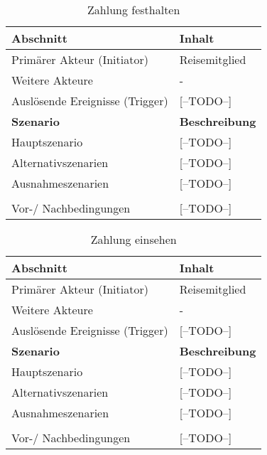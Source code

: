 \begin{table}[H]
	\caption{Zahlung festhalten}
	\begin{tabularx}{0.95\textwidth}{ |X|X| }
		\hline
		\rowcolor{gray} \textbf{Abschnitt}     & \textbf{Inhalt}       \\
		\hline
		Primärer Akteur (Initiator)            & Reisemitglied         \\
		\hline
		Weitere Akteure                        & -                     \\
		\hline
		Auslösende Ereignisse (Trigger)        & [--TODO--]            \\
		\hline
		\rowcolor{lightgray} \textbf{Szenario} & \textbf{Beschreibung} \\
		\hline
		Hauptszenario                          & [--TODO--]            \\
		\hline
		Alternativszenarien                    & [--TODO--]            \\
		\hline
		Ausnahmeszenarien                      & [--TODO--]            \\
		\hline
		\rowcolor{lightgray}                   &                       \\
		\hline
		Vor-/ Nachbedingungen                  & [--TODO--]            \\
		\hline
	\end{tabularx}
\end{table}


\begin{table}[H]
	\caption{Zahlung einsehen}
	\begin{tabularx}{0.95\textwidth}{ |X|X| }
		\hline
		\rowcolor{gray} \textbf{Abschnitt}     & \textbf{Inhalt}       \\
		\hline
		Primärer Akteur (Initiator)            & Reisemitglied         \\
		\hline
		Weitere Akteure                        & -                     \\
		\hline
		Auslösende Ereignisse (Trigger)        & [--TODO--]            \\
		\hline
		\rowcolor{lightgray} \textbf{Szenario} & \textbf{Beschreibung} \\
		\hline
		Hauptszenario                          & [--TODO--]            \\
		\hline
		Alternativszenarien                    & [--TODO--]            \\
		\hline
		Ausnahmeszenarien                      & [--TODO--]            \\
		\hline
		\rowcolor{lightgray}                   &                       \\
		\hline
		Vor-/ Nachbedingungen                  & [--TODO--]            \\
		\hline
	\end{tabularx}
\end{table}


